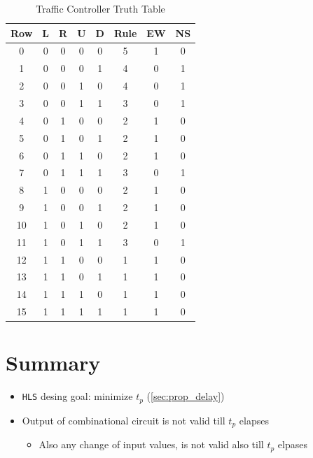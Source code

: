 \begin{table}[h]
\centering
\begin{tabular}{|c|c|c|c|c|c|c|c|}
\hline
Row & L & R & U & D & Rule & EW & NS \\
\hline
0  & 0 & 0 & 0 & 0 & 5  & 1 & 0 \\
\hline
1  & 0 & 0 & 0 & 1 & 4  & 0 & 1 \\
\hline
2  & 0 & 0 & 1 & 0 & 4  & 0 & 1 \\
\hline
3  & 0 & 0 & 1 & 1 & 3  & 0 & 1 \\
\hline
4  & 0 & 1 & 0 & 0 & 2  & 1 & 0 \\
\hline
5  & 0 & 1 & 0 & 1 & 2  & 1 & 0 \\
\hline
6  & 0 & 1 & 1 & 0 & 2  & 1 & 0 \\
\hline
7  & 0 & 1 & 1 & 1 & 3  & 0 & 1 \\
\hline
8  & 1 & 0 & 0 & 0 & 2  & 1 & 0 \\
\hline
9  & 1 & 0 & 0 & 1 & 2  & 1 & 0 \\
\hline
10 & 1 & 0 & 1 & 0 & 2 & 1 & 0 \\
\hline
11 & 1 & 0 & 1 & 1 & 3 & 0 & 1 \\
\hline
12 & 1 & 1 & 0 & 0 & 1 & 1 & 0 \\
\hline
13 & 1 & 1 & 0 & 1 & 1 & 1 & 0 \\
\hline
14 & 1 & 1 & 1 & 0 & 1 & 1 & 0 \\
\hline
15 & 1 & 1 & 1 & 1 & 1 & 1 & 0 \\
\hline
\end{tabular}
\caption{Traffic Controller Truth Table}
\label{tab:traffic_controller_truth_table}
\end{table}


\newpage
\section{Summary}

\begin{itemize}

\item \verb|HLS| desing goal: minimize $t_p$ (\ref{sec:prop_delay})

\item Output of combinational circuit is not valid till $t_p$ elapses

	\begin{itemize}
	\item Also any change of input values, is not valid also till $t_p$ elpases
	\end{itemize}


\end{itemize}



